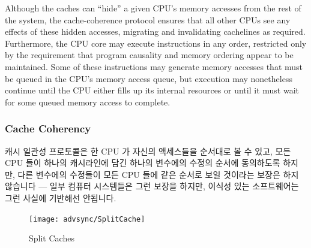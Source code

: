 \begin{enumerate}
Although the caches can ``hide'' a given CPU's memory accesses from the rest of
the system, the cache-coherence protocol ensures that all other CPUs see
any effects of these hidden accesses, migrating and invalidating cachelines
as required.
Furthermore, the CPU core may execute instructions in any order, restricted
only by the requirement that program causality and memory ordering
appear to be maintained.
Some of these instructions may generate memory accesses that must be queued
in the CPU's memory access queue, but execution may nonetheless continue
until the CPU either fills up its internal resources or until it must
wait for some queued memory access to complete.
\fi

\subsubsection{Cache Coherency}
\label{sec:advsync:Cache Coherency}

캐시 일관성 프로토콜은 한 CPU 가 자신의 액세스들을 순서대로 볼 수 있고, 모든
CPU 들이 하나의 캐시라인에 담긴 하나의 변수에의 수정의 순서에 동의하도록
하지만, 다른 변수에의 수정들이 모든 CPU 들에 같은 순서로 보일 것이라는 보장은
하지 않습니다 --- 일부 컴퓨터 시스템들은 그런 보장을 하지만, 이식성 있는
소프트웨어는 그런 사실에 기반해선 안됩니다.

\begin{figure}[htb]
\centering
\texttt{[image: advsync/SplitCache]}
\caption{Split Caches}
\end{figure}


\end{enumerate}
